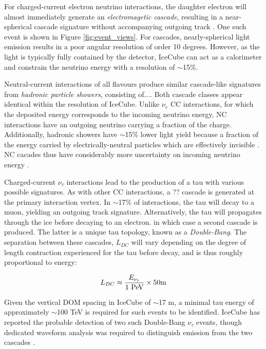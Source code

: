 For charged-current electron neutrino interactions, the daughter electron will almost immediately generate an \emph{electromagetic cascade}, resulting in a near-spherical cascade signature without accompanying outgoing track . One such event is shown in Figure \ref{fig:event_views}. For cascades, nearly-spherical light emission results in a poor angular resolution of order 10 degrees. However, as the light is typically fully contained by the detector, IceCube can act as a calorimeter and constrain the neutrino energy with a resolution of $\sim$15\%. 

Neutral-current interactions of all flavours produce similar cascade-like signatures from \emph{hadronic particle showers}, consisting of.... Both cascade classes appear identical within the resolution of IceCube. Unlike $\nu_{e}$ CC interactions, for which the deposited energy corresponds to the incoming neutrino energy, NC interactions have an outgoing neutrino carrying a fraction of the charge. Additionally, hadronic showers have $\sim$15\% lower light yield because a fraction of the energy carried by electrically-neutral particles which are effectively invisible \cite{ic_energy_reco_14}. NC cacades thus have considerably more uncertainty on incoming neutrino energy \cite{ic_energy_reco_14}.

Charged-current $\nu_{\tau}$ interactions lead to the production of a tau with various possible signatures. As with other CC interactions, a ?? cascade is generated at the primary interaction vertex. In $\sim$17\% of interactions, the tau will decay to a muon, yielding an outgoing track signature. Alternatively, the tau will propagates through the ice before decaying to an electron. in which case a second cascade is produced. The latter is a unique tau topology, known as a \emph{Double-Bang}. The separation between these cascades, $L_{DC}$ will vary depending on the degree of length contraction experienced for the tau before decay, and is thus roughly proportional to energy:

\begin{equation}
	L_{DC}  \approx \frac{E_{\nu_{\tau}}}{\textup{1 PeV}} \times 50 \textup{m}
\end{equation}

Given the vertical  DOM spacing in IceCube of $\sim $17 m, a minimal tau energy of approximately $\sim$100 TeV is required for such events to be identified. IceCube has reported the probable detection of two such Double-Bang $\nu_{\tau}$ events, though dedicated waveform analysis was required to distinguish emission from the two cascades . 

